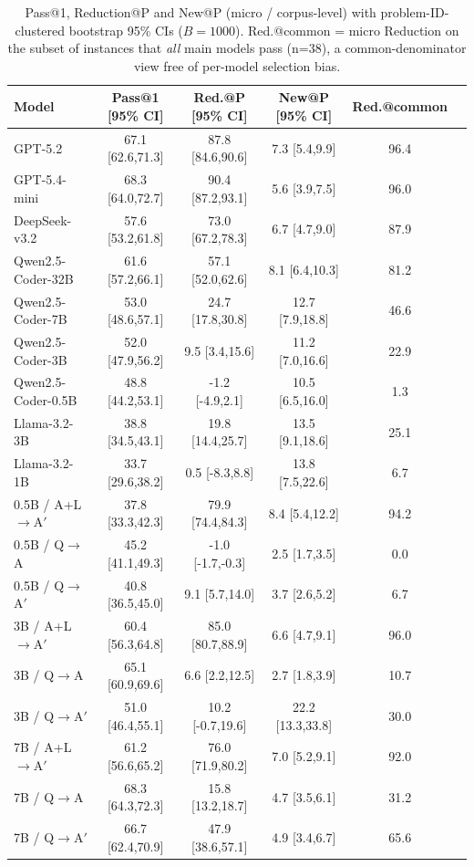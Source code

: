 \begin{table}[t]
\centering
\small
\begin{tabular}{lccccc}
\toprule
\textbf{Model} & \textbf{Pass@1} [95\% CI] & \textbf{Red.@P} [95\% CI] & \textbf{New@P} [95\% CI] & \textbf{Red.@common}\\
\midrule
GPT-5.2 & 67.1 [62.6,71.3] & 87.8 [84.6,90.6] & 7.3 [5.4,9.9] & 96.4 \\
GPT-5.4-mini & 68.3 [64.0,72.7] & 90.4 [87.2,93.1] & 5.6 [3.9,7.5] & 96.0 \\
DeepSeek-v3.2 & 57.6 [53.2,61.8] & 73.0 [67.2,78.3] & 6.7 [4.7,9.0] & 87.9 \\
Qwen2.5-Coder-32B & 61.6 [57.2,66.1] & 57.1 [52.0,62.6] & 8.1 [6.4,10.3] & 81.2 \\
Qwen2.5-Coder-7B & 53.0 [48.6,57.1] & 24.7 [17.8,30.8] & 12.7 [7.9,18.8] & 46.6 \\
Qwen2.5-Coder-3B & 52.0 [47.9,56.2] & 9.5 [3.4,15.6] & 11.2 [7.0,16.6] & 22.9 \\
Qwen2.5-Coder-0.5B & 48.8 [44.2,53.1] & -1.2 [-4.9,2.1] & 10.5 [6.5,16.0] & 1.3 \\
Llama-3.2-3B & 38.8 [34.5,43.1] & 19.8 [14.4,25.7] & 13.5 [9.1,18.6] & 25.1 \\
Llama-3.2-1B & 33.7 [29.6,38.2] & 0.5 [-8.3,8.8] & 13.8 [7.5,22.6] & 6.7 \\
0.5B / A+L$\rightarrow$A$'$ & 37.8 [33.3,42.3] & 79.9 [74.4,84.3] & 8.4 [5.4,12.2] & 94.2 \\
0.5B / Q$\rightarrow$A & 45.2 [41.1,49.3] & -1.0 [-1.7,-0.3] & 2.5 [1.7,3.5] & 0.0 \\
0.5B / Q$\rightarrow$A$'$ & 40.8 [36.5,45.0] & 9.1 [5.7,14.0] & 3.7 [2.6,5.2] & 6.7 \\
3B / A+L$\rightarrow$A$'$ & 60.4 [56.3,64.8] & 85.0 [80.7,88.9] & 6.6 [4.7,9.1] & 96.0 \\
3B / Q$\rightarrow$A & 65.1 [60.9,69.6] & 6.6 [2.2,12.5] & 2.7 [1.8,3.9] & 10.7 \\
3B / Q$\rightarrow$A$'$ & 51.0 [46.4,55.1] & 10.2 [-0.7,19.6] & 22.2 [13.3,33.8] & 30.0 \\
7B / A+L$\rightarrow$A$'$ & 61.2 [56.6,65.2] & 76.0 [71.9,80.2] & 7.0 [5.2,9.1] & 92.0 \\
7B / Q$\rightarrow$A & 68.3 [64.3,72.3] & 15.8 [13.2,18.7] & 4.7 [3.5,6.1] & 31.2 \\
7B / Q$\rightarrow$A$'$ & 66.7 [62.4,70.9] & 47.9 [38.6,57.1] & 4.9 [3.4,6.7] & 65.6 \\
\bottomrule
\end{tabular}
\caption{Pass@1, Reduction@P and New@P (micro / corpus-level) with problem-ID-clustered bootstrap 95\% CIs ($B=1000$). Red.@common = micro Reduction on the subset of instances that \emph{all} main models pass (n=38), a common-denominator view free of per-model selection bias.}
\label{tab:pass_at1_ci}
\end{table}